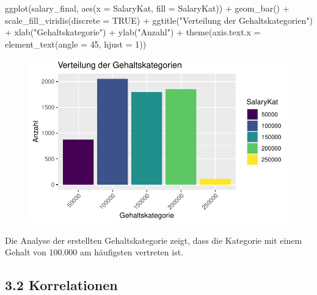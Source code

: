 \documentclass[
  letterpaper,
  DIV=11,
  numbers=noendperiod]{scrartcl}
\newenvironment{Shaded}{\begin{snugshade}}{\end{snugshade}}
\newcommand{\AttributeTok}[1]{\textcolor[rgb]{0.40,0.45,0.13}{#1}}
\newcommand{\ConstantTok}[1]{\textcolor[rgb]{0.56,0.35,0.01}{#1}}
\newcommand{\DecValTok}[1]{\textcolor[rgb]{0.68,0.00,0.00}{#1}}
\newcommand{\FunctionTok}[1]{\textcolor[rgb]{0.28,0.35,0.67}{#1}}
\newcommand{\NormalTok}[1]{\textcolor[rgb]{0.00,0.23,0.31}{#1}}
\newcommand{\SpecialCharTok}[1]{\textcolor[rgb]{0.37,0.37,0.37}{#1}}
\newcommand{\StringTok}[1]{\textcolor[rgb]{0.13,0.47,0.30}{#1}}
\begin{document}
\begin{Shaded}
\begin{Highlighting}[]
\FunctionTok{ggplot}\NormalTok{(salary\_final, }\FunctionTok{aes}\NormalTok{(}\AttributeTok{x =}\NormalTok{ SalaryKat, }\AttributeTok{fill =}\NormalTok{ SalaryKat)) }\SpecialCharTok{+}
  \FunctionTok{geom\_bar}\NormalTok{() }\SpecialCharTok{+}
  \FunctionTok{scale\_fill\_viridis}\NormalTok{(}\AttributeTok{discrete =} \ConstantTok{TRUE}\NormalTok{) }\SpecialCharTok{+}
  \FunctionTok{ggtitle}\NormalTok{(}\StringTok{"Verteilung der Gehaltskategorien"}\NormalTok{) }\SpecialCharTok{+}
  \FunctionTok{xlab}\NormalTok{(}\StringTok{"Gehaltskategorie"}\NormalTok{) }\SpecialCharTok{+}
  \FunctionTok{ylab}\NormalTok{(}\StringTok{"Anzahl"}\NormalTok{) }\SpecialCharTok{+}
  \FunctionTok{theme}\NormalTok{(}\AttributeTok{axis.text.x =} \FunctionTok{element\_text}\NormalTok{(}\AttributeTok{angle =} \DecValTok{45}\NormalTok{, }\AttributeTok{hjust =} \DecValTok{1}\NormalTok{))}
\end{Highlighting}
\end{Shaded}

\begin{figure}[H]

{\centering \includegraphics{main_doc_files/figure-pdf/unnamed-chunk-20-1.pdf}

}

\end{figure}

Die Analyse der erstellten Gehaltskategorie zeigt, dass die Kategorie
mit einem Gehalt von 100.000 am häufigsten vertreten ist.

\hypertarget{korrelationen}{%
\subsection{3.2 Korrelationen}\label{korrelationen}}
\end{document}
